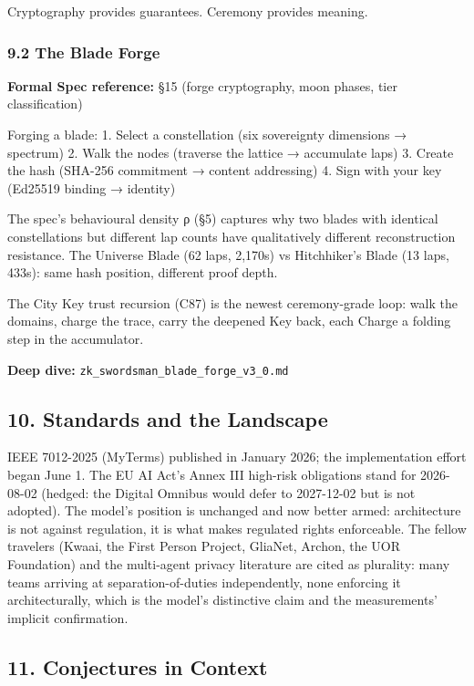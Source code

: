 \documentclass[
]{article}
\newcounter{none} %
\begin{document}
Cryptography provides guarantees. Ceremony provides meaning.

\subsubsection{9.2 The Blade Forge}\label{the-blade-forge}

\textbf{Formal Spec reference:} §15 (forge cryptography, moon phases,
tier classification)

Forging a blade: 1. Select a constellation (six sovereignty dimensions →
spectrum) 2. Walk the nodes (traverse the lattice → accumulate laps) 3.
Create the hash (SHA-256 commitment → content addressing) 4. Sign with
your key (Ed25519 binding → identity)

The spec's behavioural density ρ (§5) captures why two blades with
identical constellations but different lap counts have qualitatively
different reconstruction resistance. The Universe Blade (62 laps,
2,170s) vs Hitchhiker's Blade (13 laps, 433s): same hash position,
different proof depth.

The City Key trust recursion (C87) is the newest ceremony-grade loop:
walk the domains, charge the trace, carry the deepened Key back, each
Charge a folding step in the accumulator.

\textbf{Deep dive:} \texttt{zk\_swordsman\_blade\_forge\_v3\_0.md}

\subsection{10. Standards and the
Landscape}\label{standards-and-the-landscape}

IEEE 7012-2025 (MyTerms) published in January 2026; the implementation
effort began June 1. The EU AI Act's Annex III high-risk obligations
stand for 2026-08-02 (hedged: the Digital Omnibus would defer to
2027-12-02 but is not adopted). The model's position is unchanged and
now better armed: architecture is not against regulation, it is what
makes regulated rights enforceable. The fellow travelers (Kwaai, the
First Person Project, GliaNet, Archon, the UOR Foundation) and the
multi-agent privacy literature are cited as plurality: many teams
arriving at separation-of-duties independently, none enforcing it
architecturally, which is the model's distinctive claim and the
measurements' implicit confirmation.

\subsection{11. Conjectures in Context}\label{conjectures-in-context}
\end{document}
